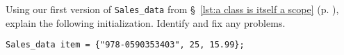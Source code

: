 %
%
\begin{question}
Using our first version of \verb|Sales_data| from \S~\ref{lst:a class is itself a scope} (p. \pageref{lst:a class is itself a scope}),
explain the following initialization. Identify and fix any problems.
\begin{lstlisting}
Sales_data item = {"978-0590353403", 25, 15.99};
\end{lstlisting}
\end{question}

